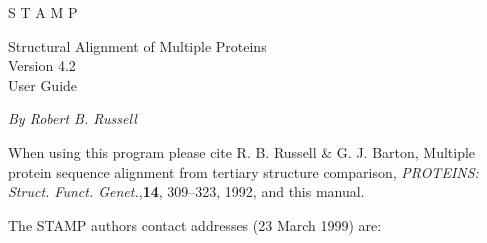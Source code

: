 
\newcommand{\al}{\mbox{$\alpha$~}}  
\newcommand{\be}{\mbox{$\beta$~}}  
\newcommand{\albe}{\mbox{$\alpha/\beta$~}}
  
\newcommand{\tten}{\mbox{${\rm 3_{10}}$~}}  
\newcommand{\ea}{\mbox{\em et al. \/}}  
\newcommand{\Cal}{\mbox{${\rm C}_{\alpha}$~}}  
\newcommand{\Cbe}{\mbox{${\rm C}_{\beta}$~}}
\newcommand{\ii}{\mbox{$i$~}}
\newcommand{\jj}{\mbox{$j$~}}
\newcommand{\ip}{\mbox{$i^{\prime}$~}}
\newcommand{\jp}{\mbox{$j^{\prime}$~}}
\newcommand{\sdp}{\setlength{\baselineskip}{18truept}}
\newcommand{\ssp}{\setlength{\baselineskip}{13.6truept}}
  



\begin{titlepage}
\begin{center}
\begin{bf}
\begin{Huge}
S T A M P\\
\end{Huge}
\begin{Large}
Structural Alignment of Multiple Proteins \\
Version 4.2\\
User Guide\\
\end{Large}
\end{bf}
\vskip 0.25in

{\em By Robert B. Russell}\\
\end{center}
\vskip 0.25in

\noindent
When using this program please cite R. B. Russell \& G. J.  Barton, 
Multiple protein sequence alignment from tertiary structure 
comparison, {\em PROTEINS: Struct. Funct. Genet.},{\bf 14}, 
309--323, 1992, and this manual.\\

\vskip 0.25in

The STAMP authors contact addresses (23 March 1999) are:

\vskip 0.1in


\end{titlepage}
